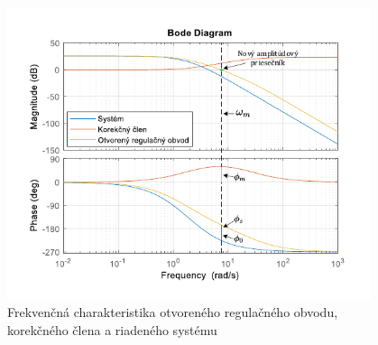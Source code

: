 \documentclass[a4paper,10pt]{article}
\begin{document}
\begin{figure}[ht]
\centering
\includegraphics[width=0.95\textwidth]{OROBode}
\caption{Frekvenčná charakteristika otvoreného regulačného obvodu, korekčného člena a riadeného systému}
\end{figure}
\end{document}

